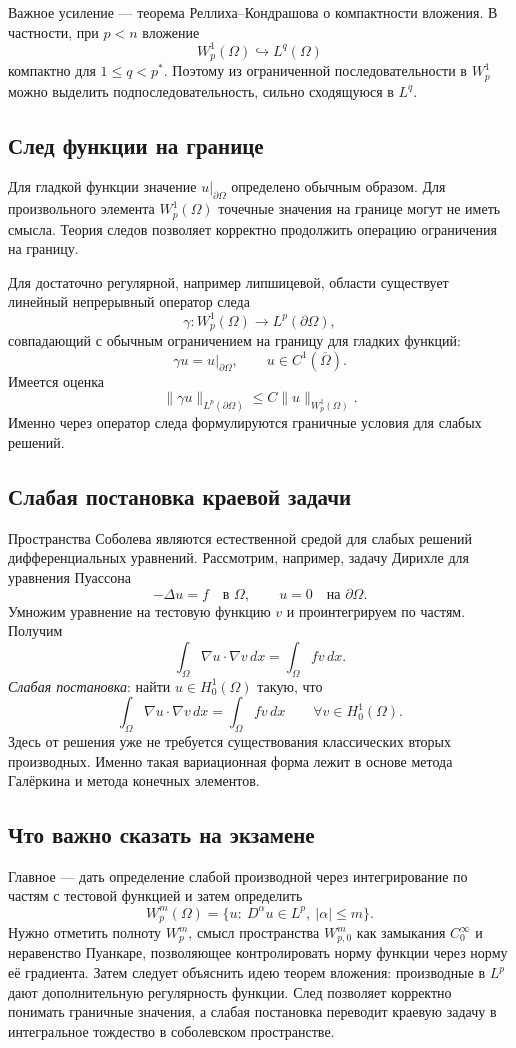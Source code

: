 Важное усиление --- теорема Реллиха--Кондрашова о компактности вложения. В
частности, при $p<n$ вложение
\[
    W_p^1(\Omega)\hookrightarrow L^q(\Omega)
\]
компактно для $1\leq q<p^*$. Поэтому из ограниченной последовательности в
$W_p^1$ можно выделить подпоследовательность, сильно сходящуюся в $L^q$.

\subsection{След функции на границе}

Для гладкой функции значение $u|_{\partial\Omega}$ определено обычным образом.
Для произвольного элемента $W_p^1(\Omega)$ точечные значения на границе могут
не иметь смысла. Теория следов позволяет корректно продолжить операцию
ограничения на границу.

Для достаточно регулярной, например липшицевой, области существует линейный
непрерывный оператор следа
\[
    \gamma:W_p^1(\Omega)\longrightarrow L^p(\partial\Omega),
\]
совпадающий с обычным ограничением на границу для гладких функций:
\[
    \gamma u=u|_{\partial\Omega},
    \qquad u\in C^1(\overline\Omega).
\]
Имеется оценка
\[
    \|\gamma u\|_{L^p(\partial\Omega)}
    \leq C\|u\|_{W_p^1(\Omega)}.
\]
Именно через оператор следа формулируются граничные условия для слабых решений.

\subsection{Слабая постановка краевой задачи}

Пространства Соболева являются естественной средой для слабых решений
дифференциальных уравнений. Рассмотрим, например, задачу Дирихле для уравнения
Пуассона
\[
    -\Delta u=f\quad\text{в }\Omega,
    \qquad u=0\quad\text{на }\partial\Omega.
\]
Умножим уравнение на тестовую функцию $v$ и проинтегрируем по частям. Получим
\[
    \int_\Omega \nabla u\cdot\nabla v\,dx
    =\int_\Omega f v\,dx.
\]
\emph{Слабая постановка}: найти $u\in H_0^1(\Omega)$ такую, что
\[
    \int_\Omega \nabla u\cdot\nabla v\,dx
    =\int_\Omega f v\,dx
    \qquad\forall v\in H_0^1(\Omega).
\]
Здесь от решения уже не требуется существования классических вторых
производных. Именно такая вариационная форма лежит в основе метода Галёркина и
метода конечных элементов.

\subsection{Что важно сказать на экзамене}

Главное --- дать определение слабой производной через интегрирование по частям
с тестовой функцией и затем определить
\[
    W_p^m(\Omega)=\{u:\ D^\alpha u\in L^p,
    \ |\alpha|\leq m\}.
\]
Нужно отметить полноту $W_p^m$, смысл пространства $W_{p,0}^m$ как замыкания
$C_0^\infty$ и неравенство Пуанкаре, позволяющее контролировать норму функции
через норму её градиента. Затем следует объяснить идею теорем вложения:
производные в $L^p$ дают дополнительную регулярность функции. След позволяет корректно понимать
граничные значения, а слабая постановка переводит краевую задачу в интегральное
тождество в соболевском пространстве.

\newpage
